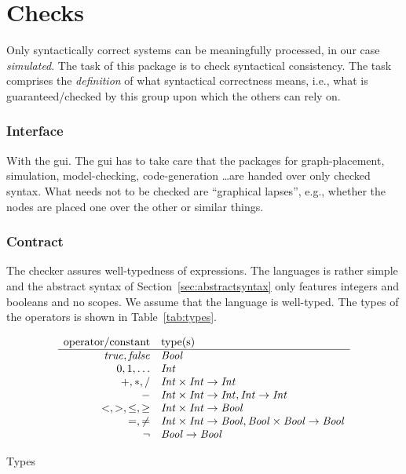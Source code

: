 \section{Checks}

\label{sec:checks}


Only syntactically correct systems can be meaningfully processed, in our
case \emph{simulated}. The task of this package is to check syntactical
consistency. The task comprises the \emph{definition} of what syntactical
correctness means, i.e., what is guaranteed/checked by this group upon
which the others can rely on.





\subsubsection*{Interface}

With the gui. The gui has to take care that the packages for
graph-placement, simulation, model-checking, code-generation \ldots are
handed over only checked syntax. What needs not to be checked are
``graphical lapses'', e.g., whether the nodes are placed one over the other
or similar things. 


\subsubsection*{Contract}



The checker assures well-typedness of expressions. The languages is rather
simple and the abstract syntax of Section~\ref{sec:abstractsyntax} only
features integers and booleans and no scopes. We assume that the language
is well-typed.  The types of the operators is shown in
Table~\ref{tab:types}.




\begin{table}[htbp]
  \centering
  \begin{displaymath}
    \begin{array}{rl}
      \text{operator/constant} & \text{type(s)}
      \\\hline
      \mathit{true},\mathit{false}
      & \mathit{Bool}
      \\
      0,1,\ldots & \mathit{Int}
      \\
      +,*,/ & \mathit{Int} \times \mathit{Int} \to \mathit{Int}
      \\
      -     & \mathit{Int} \times \mathit{Int} \to \mathit{Int}, \mathit{Int}\to\mathit{Int}
      \\
      <,>,\leq,\geq & \mathit{Int} \times\mathit{Int} \to \mathit{Bool}
      \\
      =, \not= & \mathit{Int}\times\mathit{Int} \to \mathit{Bool}, \mathit{Bool}\times\mathit{Bool}\to\mathit{Bool}
      \\
      \neg & \mathit{Bool}\to \mathit{Bool}
    \end{array}
  \end{displaymath}
  \caption{Types}
  \label{tab:types}
\end{table}


